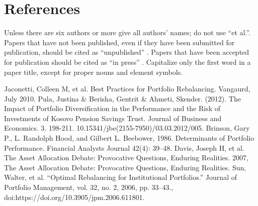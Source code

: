 \documentclass{article}
\begin{document}
\section*{References}

Unless there are six authors or more give all authors' names; do not use 
``et al.''. Papers that have not been published, even if they have been 
submitted for publication, should be cited as ``unpublished'' \cite{b4}. Papers 
that have been accepted for publication should be cited as ``in press'' \cite{b5}. 
Capitalize only the first word in a paper title, except for proper nouns and 
element symbols.

\begin{thebibliography}{00}
 Jaconetti, Colleen M, et al. Best Practices for Portfolio Rebalancing. Vangaurd, July 2010.
 Pula, Justina \& Berisha, Gentrit \& Ahmeti, Skender. (2012). The Impact of Portfolio Diversification in the Performance and the Risk of Investments of Kosovo Pension Savings Trust. Journal of Business and Economics. 3. 198-211. 10.15341/jbe(2155-7950)/03.03.2012/005. 
 Brinson, Gary P., L. Randolph Hood, and Gilbert L. Beebower, 1986. Determinants of Portfolio Performance. Financial Analysts Journal 42(4): 39–48.
 Davis, Joseph H, et al. The Asset Allocation Debate: Provocative Questions, Enduring Realities. 2007, The Asset Allocation Debate: Provocative Questions, Enduring Realities.
 Sun, Walter, et al. “Optimal Rebalancing for Institutional Portfolios.” Journal of Portfolio Management, vol. 32, no. 2, 2006, pp. 33–43., doi:https://doi.org/10.3905/jpm.2006.611801.

\end{thebibliography}
\end{document}
